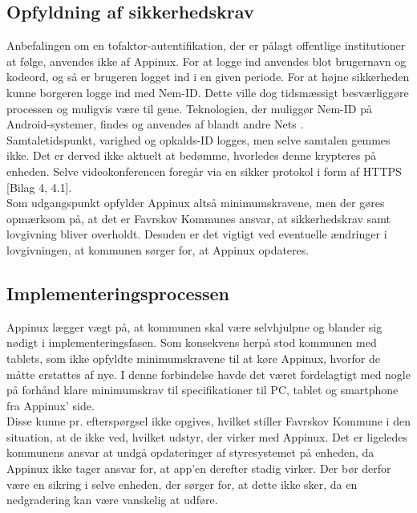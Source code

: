 \subsection{Opfyldning af sikkerhedskrav}
Anbefalingen om en tofaktor-autentifikation, der er pålagt offentlige institutioner at følge, anvendes ikke af Appinux. For at logge ind anvendes blot brugernavn og kodeord, og så er brugeren logget ind i en given periode. For at højne sikkerheden kunne borgeren logge ind med Nem-ID. Dette ville dog tidsmæssigt besværliggøre processen og muligvis være til gene. Teknologien, der muliggør Nem-ID på Android-systemer, findes og anvendes af blandt andre Nets \cite{netsapp}.\\
Samtaletidspunkt, varighed og opkalds-ID logges, men selve samtalen gemmes ikke. Det er derved ikke aktuelt at bedømme, hvorledes denne krypteres på enheden. Selve videokonferencen foregår via en sikker protokol i form af HTTPS [Bilag 4, 4.1].\\
Som udgangspunkt opfylder Appinux altså minimumskravene, men der gøres opmærksom på, at det er Favrskov Kommunes ansvar, at sikkerhedskrav samt lovgivning bliver overholdt. Desuden er det vigtigt ved eventuelle ændringer i lovgivningen, at kommunen sørger for, at Appinux opdateres.

\subsection{Implementeringsprocessen}
\label{sec:implementeringsprocessen}
Appinux lægger vægt på, at kommunen skal være selvhjulpne og blander sig nødigt i implementeringsfasen. Som konsekvens herpå stod kommunen med tablets, som ikke opfyldte minimumskravene til at køre Appinux, hvorfor de måtte erstattes af nye. I denne forbindelse havde det været fordelagtigt med nogle på forhånd klare minimumskrav til specifikationer til PC, tablet og smartphone fra Appinux' side.\\Disse kunne pr. efterspørgsel ikke opgives, hvilket stiller Favrskov Kommune i den situation, at de ikke ved, hvilket udstyr, der virker med Appinux. Det er ligeledes kommunens ansvar at undgå opdateringer af styresystemet på enheden, da Appinux ikke tager ansvar for, at app'en derefter stadig virker. Der bør derfor være en sikring i selve enheden, der sørger for, at dette ikke sker, da en nedgradering kan være vanskelig at udføre.
